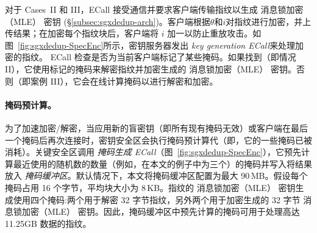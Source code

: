 对于 Cases~II 和 III，ECall 接受通信并要求客户端传输指纹以生成 消息锁加密（MLE） 密钥 (\S\ref{subsec:sgxdedup-arch})。客户端根据$\theta$和$i$对指纹进行加密，并上​​传结果；在加密每个指纹块后，客户端将 $i$ 加一以防止重放攻击。如图~\ref{fig:sgxdedup-SpecEnc}所示，密钥服务器发出\textit{ key generation ECall}来处理加密的指纹。 ECall 检查是否为当前客户端标记了某些掩码。如果找到（即情况 II），它使用标记的掩码来解密指纹并加密生成的 消息锁加密（MLE） 密钥。否则（即案例 III），它会在线计算掩码以进行解密和加密。

\paragraph*{掩码预计算。} 为了加速加密/解密，当应用新的盲密钥（即所有现有掩码无效）或客户端在最后一个掩码后再次连接时，密钥安全区会执行掩码预计算代（即，它的一些掩码已被消耗）。关键安全区调用 \textit{ 掩码生成 ECall}（图~\ref{fig:sgxdedup-SpecEnc}），它预先计算最近使用的随机数的数量（例如，在本文的例子中为三个）的掩码并写入将结果放入 \textit{ 掩码缓冲区}。默认情况下，本文将掩码缓冲区配置为最大 90\,MB。假设每个掩码占用 16 个字节，平均块大小为 8\,KB。指纹的 消息锁加密（MLE） 密钥生成使用四个掩码:两个用于解密 32 字节指纹，另外两个用于加密生成的 32 字节 消息锁加密（MLE） 密钥。因此，掩码缓冲区中预先计算的掩码可用于处理高达 11.25GB 数据的指纹。
